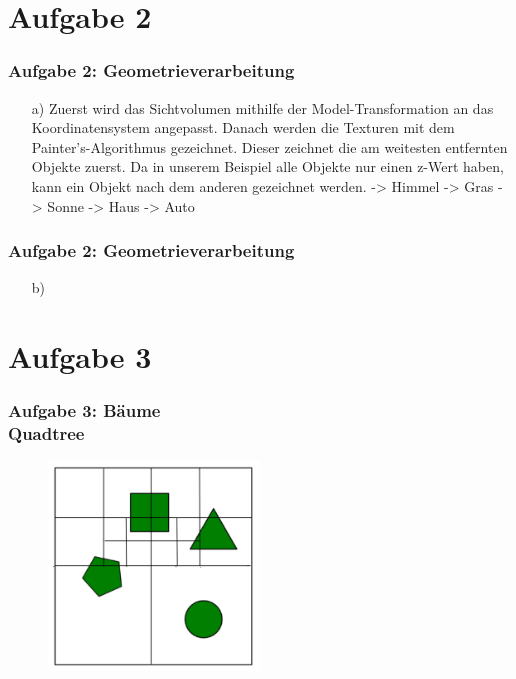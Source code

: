 \documentclass[accentcolor=tud9c,colorbacktitle,inverttitle,landscape,german,presentation,t]{tudbeamer}
\begin{document}
\section{Aufgabe 2}
	\begin{frame}
		\frametitle{Aufgabe 2: Geometrieverarbeitung} %
		\begin{itemize}
		\item[a)] Zuerst wird das Sichtvolumen mithilfe der Model-Transformation an das Koordinatensystem angepasst. Danach werden die Texturen mit dem Painter's-Algorithmus gezeichnet. Dieser zeichnet die am weitesten entfernten Objekte zuerst. Da in unserem Beispiel alle Objekte nur einen z-Wert haben, kann ein Objekt nach dem anderen gezeichnet werden. -> Himmel -> Gras -> Sonne -> Haus -> Auto
		\end{itemize}
	\end{frame}
	\begin{frame}
	\frametitle{Aufgabe 2: Geometrieverarbeitung} %
	\begin{itemize}

		\item[b)]
	\end{itemize}
\end{frame}
	
\section{Aufgabe 3}
\begin{frame}
	\frametitle{Aufgabe 3: B\"aume \\Quadtree} 
	\begin{figure}
		\centering
		\includegraphics[width=0.5\textwidth]{Quadtree}
	\end{figure}
\end{frame}
\end{document}
